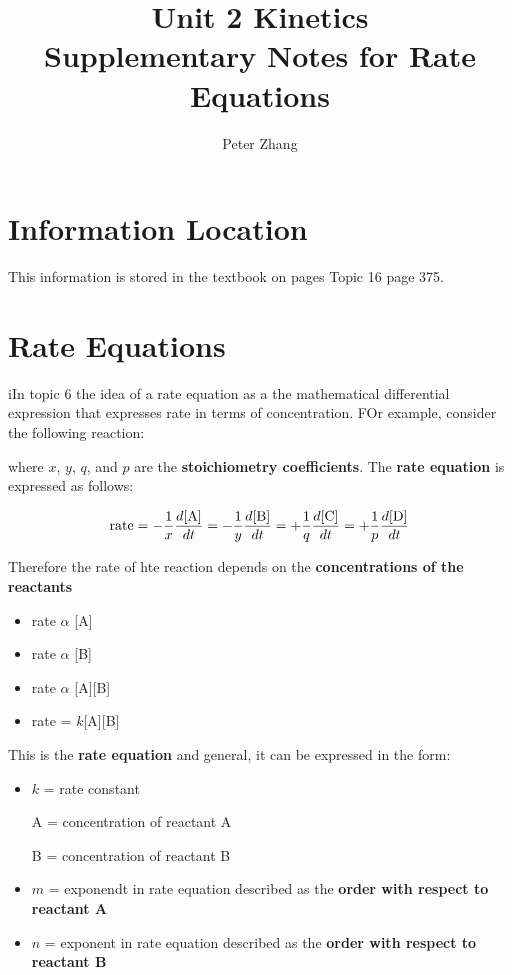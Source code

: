 \documentclass{article}
\title{Unit 2 Kinetics\\Supplementary Notes for Rate Equations}
\author{Peter Zhang}
\begin{document}
\maketitle
\newpage
\tableofcontents
\newpage

\section{Information Location}
This information is stored in the textbook on pages Topic 16 page 375.

\section{Rate Equations}
iIn topic 6 the idea of a rate equation as a the mathematical differential expression that expresses rate in terms of concentration. FOr example, consider the following reaction:

\begin{center}\end{center}

where $x$, $y$, $q$, and $p$ are the \textbf{stoichiometry coefficients}. The \textbf{rate equation} is expressed as follows:

$$\ce{rate} = -\frac{1}{x}\frac{d\ce{[A]}}{dt} = -\frac{1}{y}\frac{d\ce{[B]}}{dt} = +\frac{1}{q}\frac{d\ce{[C]}}{dt} = +\frac{1}{p}\frac{d\ce{[D]}}{dt}$$

Therefore the rate of hte reaction depends on the \textbf{concentrations of the reactants}
\begin{itemize}
\item rate $\alpha$ [A]
\item rate $\alpha$ [B]
\item rate $\alpha$ [A][B]
\item rate = $k$[A][B]
\end{itemize}


This is the \textbf{rate equation} and general, it can be expressed in the form:

\begin{center}\end{center}

\begin{itemize}
\item $k$ = rate constant
\item [A] = concentration of reactant A
\item [B] = concentration of reactant B
\item $m$ = exponendt in rate equation described as the \textbf{order with respect to reactant A}
\item $n$ = exponent in rate equation described as the \textbf{order with respect to reactant B}
\end{itemize}
\end{document}

